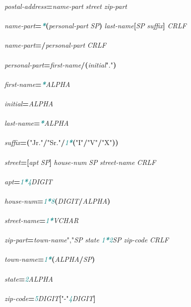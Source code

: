 \documentclass{article}
\begin{document}
{\scriptsize\ttfamily
\emph{postal{-}address}\textbf{=}\emph{name{-}part} \emph{street} \emph{zip{-}part}\\
\\
\emph{name{-}part}\textbf{=}\textcolor{teal}{\emph{\textbf{*}}}\textbf{(}\emph{personal{-}part} \emph{SP}\textbf{)} \emph{last{-}name}\textbf{[}\emph{SP} \emph{suffix}\textbf{]} \emph{CRLF}\\
\\
\emph{name{-}part}\textbf{=/}\emph{personal{-}part} \emph{CRLF}\\
\\
\emph{personal{-}part}\textbf{=}\emph{first{-}name}\textbf{/}\textbf{(}\emph{initial}\textcolor{BrickRed}{"."}\textbf{)}\\
\\
\emph{first{-}name}\textbf{=}\textcolor{teal}{\emph{\textbf{*}}}\emph{ALPHA}\\
\\
\emph{initial}\textbf{=}\emph{ALPHA}\\
\\
\emph{last{-}name}\textbf{=}\textcolor{teal}{\emph{\textbf{*}}}\emph{ALPHA}\\
\\
\emph{suffix}\textbf{=}\textbf{(}\textcolor{BrickRed}{"Jr."}\textbf{/}\textcolor{BrickRed}{"Sr."}\textbf{/}\textcolor{teal}{\emph{1\textbf{*}}}\textbf{(}\textcolor{BrickRed}{"I"}\textbf{/}\textcolor{BrickRed}{"V"}\textbf{/}\textcolor{BrickRed}{"X"}\textbf{)}\textbf{)}\\
\\
\emph{street}\textbf{=}\textbf{[}\emph{apt} \emph{SP}\textbf{]} \emph{house{-}num} \emph{SP} \emph{street{-}name} \emph{CRLF}\\
\\
\emph{apt}\textbf{=}\textcolor{teal}{\emph{1\textbf{*}4}}\emph{DIGIT}\\
\\
\emph{house{-}num}\textbf{=}\textcolor{teal}{\emph{1\textbf{*}8}}\textbf{(}\emph{DIGIT}\textbf{/}\emph{ALPHA}\textbf{)}\\
\\
\emph{street{-}name}\textbf{=}\textcolor{teal}{\emph{1\textbf{*}}}\emph{VCHAR}\\
\\
\emph{zip{-}part}\textbf{=}\emph{town{-}name}\textcolor{BrickRed}{","}\emph{SP} \emph{state} \textcolor{teal}{\emph{1\textbf{*}2}}\emph{SP} \emph{zip{-}code} \emph{CRLF}\\
\\
\emph{town{-}name}\textbf{=}\textcolor{teal}{\emph{1\textbf{*}}}\textbf{(}\emph{ALPHA}\textbf{/}\emph{SP}\textbf{)}\\
\\
\emph{state}\textbf{=}\textcolor{teal}{\emph{2}}\emph{ALPHA}\\
\\
\emph{zip{-}code}\textbf{=}\textcolor{teal}{\emph{5}}\emph{DIGIT}\textbf{[}\textcolor{BrickRed}{"{-}"}\textcolor{teal}{\emph{4}}\emph{DIGIT}\textbf{]}\\

}
\end{document}

